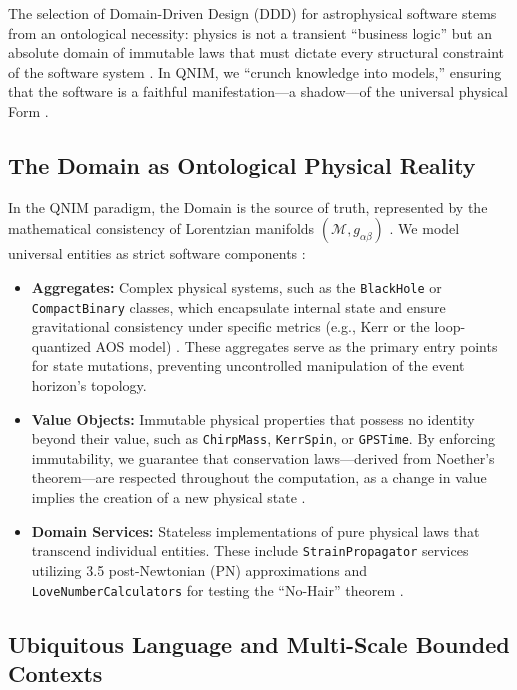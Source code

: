 \documentclass[11pt,a4paper,spanish]{book}
\numberwithin{equation}{chapter}
\numberwithin{figure}{chapter}
\numberwithin{equation}{chapter}
\numberwithin{figure}{chapter}
\numberwithin{table}{chapter}
\begin{document}
The selection of Domain-Driven Design (DDD) for astrophysical software stems from an ontological necessity: physics is not a transient ``business logic'' but an absolute domain of immutable laws that must dictate every structural constraint of the software system \cite{arxiv_ddd_review}. In QNIM, we ``crunch knowledge into models,'' ensuring that the software is a faithful manifestation—a shadow—of the universal physical Form \cite{thoughtworks_ddd}.

\subsection{The Domain as Ontological Physical Reality}

In the QNIM paradigm, the Domain is the source of truth, represented by the mathematical consistency of Lorentzian manifolds $(\mathcal{M}, g_{\alpha\beta})$ \cite{arxiv10032373}. We model universal entities as strict software components \cite{geeksforgeeks_ddd}:

\begin{itemize}
    \item \textbf{Aggregates:} Complex physical systems, such as the \texttt{BlackHole} or \texttt{CompactBinary} classes, which encapsulate internal state and ensure gravitational consistency under specific metrics (e.g., Kerr or the loop-quantized AOS model) \cite{spectral_method_kerr}. These aggregates serve as the primary entry points for state mutations, preventing uncontrolled manipulation of the event horizon's topology.
    \item \textbf{Value Objects:} Immutable physical properties that possess no identity beyond their value, such as \texttt{ChirpMass}, \texttt{KerrSpin}, or \texttt{GPSTime}. By enforcing immutability, we guarantee that conservation laws—derived from Noether’s theorem—are respected throughout the computation, as a change in value implies the creation of a new physical state \cite{khalilstemmler_ddd_clean}.
    \item \textbf{Domain Services:} Stateless implementations of pure physical laws that transcend individual entities. These include \texttt{StrainPropagator} services utilizing 3.5 post-Newtonian (PN) approximations and \texttt{LoveNumberCalculators} for testing the ``No-Hair'' theorem \cite{loop_quantum_signatures}.
\end{itemize}

\subsection{Ubiquitous Language and Multi-Scale Bounded Contexts}
\end{document}
